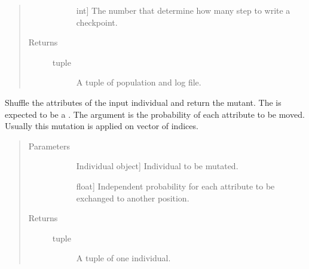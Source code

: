 \documentclass[letterpaper,10pt,english]{sphinxmanual}
\begin{document}
\begin{fulllineitems}
\begin{quote}
\begin{description}
\begin{description}
\item[{}] \leavevmode{[}int{]}
\sphinxAtStartPar
The number that determine how many step to write a checkpoint.

\end{description}

\item[{Returns}] \leavevmode\begin{description}
\item[{tuple}] \leavevmode
\sphinxAtStartPar
A tuple of population and log file.

\end{description}

\end{description}\end{quote}

\end{fulllineitems}


\begin{fulllineitems}
\label{\detokenize{pygace:pygace.ga.gaceMutShuffleIndexes}}
\sphinxAtStartPar
Shuffle the attributes of the input individual and return the mutant.
The  is expected to be a . The  argument
is the probability of each attribute to be moved. Usually this mutation is
applied on vector of indices.
\begin{quote}\begin{description}
\item[{Parameters}] \leavevmode\begin{description}
\item[{}] \leavevmode{[}Individual object{]}
\sphinxAtStartPar
Individual to be mutated.

\item[{}] \leavevmode{[}float{]}
\sphinxAtStartPar
Independent probability for each attribute to be exchanged to another
position.

\end{description}

\item[{Returns}] \leavevmode\begin{description}
\item[{tuple}] \leavevmode
\sphinxAtStartPar
A tuple of one individual.

\end{description}

\end{description}\end{quote}

\end{fulllineitems}
\end{document}
